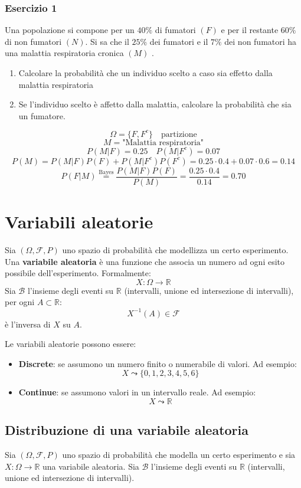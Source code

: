 \documentclass[a4paper]{article}
\theoremstyle{break}
\theoremstyle{break}
\theoremstyle{break}
\theoremstyle{break}
\begin{document}
\subsubsection{Esercizio 1}
Una popolazione si compone per un \( 40\% \)  di fumatori \((F)\) e per il restante 
\( 60\% \) di non fumatori \( (N) \). Si sa che il \( 25\% \)  dei fumatori e il 
\( 7\% \)  dei non fumatori ha una malattia respiratoria cronica \( (M) \) .
\begin{enumerate}
  \item Calcolare la probabilità che un individuo scelto a caso sia effetto dalla malattia
    respiratoria 
  \item Se l’individuo scelto è affetto dalla malattia, calcolare la probabilità che
    sia un fumatore. 
\end{enumerate}

\[
\Omega = \{F,F^c\} \quad \text{partizione}
\] 
\[
M = \text{"Malattia respiratoria"}
\] 
\[
P(M|F) = 0.25 \quad P(M|F^c) = 0.07
\] 
\[
P(M) = P(M|F)P(F) + P(M|F^c)P(F^c) = 0.25 \cdot 0.4 + 0.07 \cdot 0.6 = 0.14
\] 
\[
  P(F|M) \stackrel{\text{Bayes}}{=} \frac{P(M|F)P(F)}{P(M)} = \frac{0.25 \cdot 0.4}{0.14} = 0.70
\] 

\section{Variabili aleatorie}
Sia \( (\Omega, \mathcal{F}, P) \) uno spazio di probabilità che modellizza un certo
esperimento. Una \textbf{variabile aleatoria} è una funzione che associa un numero ad
ogni esito possibile dell'esperimento. Formalmente:
\[
X: \Omega \to \mathbb{R}
\] 
Sia \( \mathcal{B} \) l'insieme degli eventi su \( \mathbb{R} \) (intervalli, unione ed 
intersezione di intervalli), per ogni \( A \subset \mathbb{R} \):
\[
  X^{-1}(A) \in \mathcal{F}
\] 
è l'inversa di \( X \) su \( A \).

\vspace{1em}
\noindent Le variabili aleatorie possono essere:
\begin{itemize}
  \item \textbf{Discrete}: se assumono un numero finito o numerabile di valori. Ad esempio:
    \[
    X \leadsto \{0,1,2,3,4,5,6\}
    \] 
  \item \textbf{Continue}: se assumono valori in un intervallo reale. Ad esempio:
    \[
    X \leadsto \mathbb{R}
    \]
\end{itemize}

\subsection{Distribuzione di una variabile aleatoria}
Sia \( (\Omega, \mathcal{F}, P) \) uno spazio di probabilità che modella un certo
esperimento e sia \( X: \Omega \to \mathbb{R} \) una variabile aleatoria.
Sia \( \mathcal{B} \) l'insieme degli eventi su \( \mathbb{R} \) (intervalli, unione ed
intersezione di intervalli). 
\end{document}
